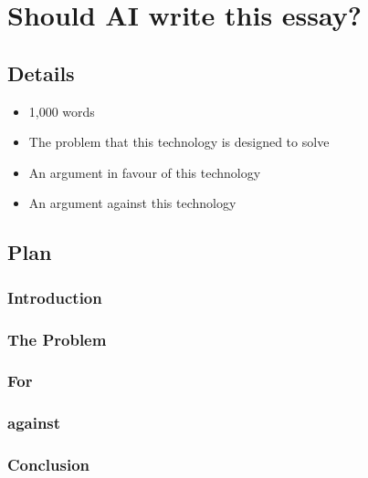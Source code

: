 \chapter{Should AI write this essay?}
\section{Details}
\begin{itemize}
    \item 1,000 words
    \item The problem that this technology is designed to solve
    \item An argument in favour of this technology
    \item An argument against this technology
\end{itemize}

\section{Plan}
\subsection{Introduction}
\subsection{The Problem}
\subsection{For}
\subsection{against}
\subsection{Conclusion}
